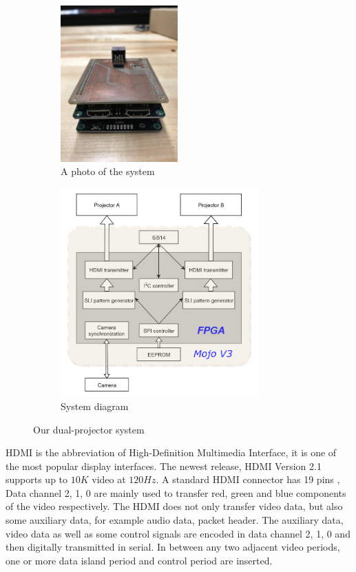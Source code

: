 \documentclass[]{spie}  %
\begin{document}
\begin{figure}
\centering
\begin{subfigure}{.5\textwidth}
  \centering
  \includegraphics[height=6cm, angle=90]{mojo.jpg}
  \caption{A photo of the system}
  \label{fig:sub1}
\end{subfigure}%
\begin{subfigure}{.5\textwidth}
  \centering
   \includegraphics[height=8cm]{sysdgv2.png}
  \caption{System diagram}
  \label{fig:sub2}
\end{subfigure}
\caption{Our dual-projector system}
\label{Fig:2}
\end{figure}

HDMI is the abbreviation of High-Definition Multimedia Interface, it is one of the most popular display interfaces. The newest release, HDMI Version 2.1 supports up to $10K$ video at $120 Hz$. A standard HDMI connector has 19 pins \cite{hdmi14}, Data channel 2, 1, 0 are mainly used to transfer red, green and blue components of the video respectively. The HDMI does not only transfer video data, but also some auxiliary data, for example audio data, packet header. The auxiliary data, video data as well as some control signals are encoded in data channel 2, 1, 0 and then digitally transmitted in serial. In between any two adjacent video periods, one or more data island period and control period are inserted. 
\end{document}
